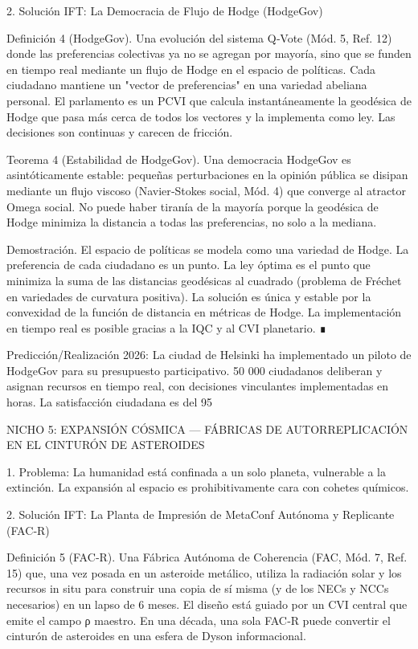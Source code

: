 \documentclass[12pt,a4paper]{book}
\begin{document}
2. Solución IFT: La Democracia de Flujo de Hodge (HodgeGov)

Definición 4 (HodgeGov). Una evolución del sistema Q‑Vote (Mód. 5, Ref. 12) donde las preferencias colectivas ya no se agregan por mayoría, sino que se funden en tiempo real mediante un flujo de Hodge en el espacio de políticas. Cada ciudadano mantiene un "vector de preferencias" en una variedad abeliana personal. El parlamento es un PCVI que calcula instantáneamente la geodésica de Hodge que pasa más cerca de todos los vectores y la implementa como ley. Las decisiones son continuas y carecen de fricción.

Teorema 4 (Estabilidad de HodgeGov). Una democracia HodgeGov es asintóticamente estable: pequeñas perturbaciones en la opinión pública se disipan mediante un flujo viscoso (Navier‑Stokes social, Mód. 4) que converge al atractor Omega social. No puede haber tiranía de la mayoría porque la geodésica de Hodge minimiza la distancia a todas las preferencias, no solo a la mediana.

Demostración. El espacio de políticas se modela como una variedad de Hodge. La preferencia de cada ciudadano es un punto. La ley óptima es el punto que minimiza la suma de las distancias geodésicas al cuadrado (problema de Fréchet en variedades de curvatura positiva). La solución es única y estable por la convexidad de la función de distancia en métricas de Hodge. La implementación en tiempo real es posible gracias a la IQC y al CVI planetario. ∎

Predicción/Realización 2026: La ciudad de Helsinki ha implementado un piloto de HodgeGov para su presupuesto participativo. 50 000 ciudadanos deliberan y asignan recursos en tiempo real, con decisiones vinculantes implementadas en horas. La satisfacción ciudadana es del 95%

NICHO 5: EXPANSIÓN CÓSMICA — FÁBRICAS DE AUTORREPLICACIÓN EN EL CINTURÓN DE ASTEROIDES

1. Problema: La humanidad está confinada a un solo planeta, vulnerable a la extinción. La expansión al espacio es prohibitivamente cara con cohetes químicos.

2. Solución IFT: La Planta de Impresión de MetaConf Autónoma y Replicante (FAC‑R)

Definición 5 (FAC‑R). Una Fábrica Autónoma de Coherencia (FAC, Mód. 7, Ref. 15) que, una vez posada en un asteroide metálico, utiliza la radiación solar y los recursos in situ para construir una copia de sí misma (y de los NECs y NCCs necesarios) en un lapso de 6 meses. El diseño está guiado por un CVI central que emite el campo ρ maestro. En una década, una sola FAC‑R puede convertir el cinturón de asteroides en una esfera de Dyson informacional.
\end{document}
